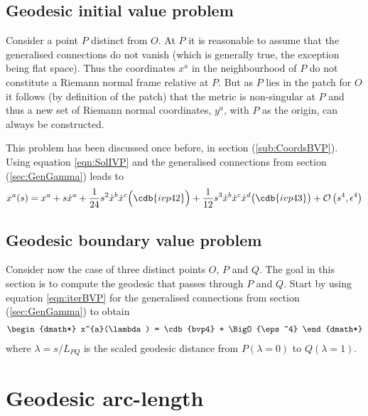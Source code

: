 \documentclass[a4paper,12pt]{article}
\numberwithin{equation}{section}
\begin{document}
\subsection{Geodesic initial value problem}\label{sec:GeodesicIVP}

Consider a point $P$ distinct from $O$. At $P$ it is reasonable to assume that the
generalised connections do not vanish (which is generally true, the exception being flat
space). Thus the coordinates $x^a$ in the neighbourhood of $P$ do not constitute a Riemann
normal frame relative at $P$. But as $P$ lies in the patch for $O$ it follows (by definition
of the patch) that the metric is non-singular at $P$ and thus a new set of Riemann normal
coordinates, $y^a$, with $P$ as the origin, can always be constructed.

This problem has been discussed once before, in section (\ref{sub:CoordsBVP}). Using equation
\eqref{eqn:SolIVP} and the generalised connections from section (\ref{sec:GenGamma}) leads to
%
\begin{dmath*}x^{a}(s)
   = x^{a}
   + s \dotx^{a}
   + \frac{1}{24} s^2 {\Dot x}^b {\Dot x}^c \Bigl(\cdb{ivp42}\Bigr)
   + \frac{1}{12} s^3 {\Dot x}^b {\Dot x}^c {\Dot x}^d \bigl(\cdb{ivp43}\bigr)
   + \BigO{s^4,\eps^4}\end{dmath*}
%
\subsection{Geodesic boundary value problem}\label{sec:GeodesicBVP}

Consider now the case of three distinct points $O$, $P$ and $Q$. The goal in this section is
to compute the geodesic that passes through $P$ and $Q$. Start by using equation
\eqref{eqn:iterBVP} for the generalised connections from section (\ref{sec:GenGamma}) to
obtain
%
\begin{dgroup*}[compact,spread={3pt}]
\begin{dmath*} x^{a}(\lambda) = \cdb{bvp4} + \BigO{\eps^4} \end{dmath*}
\end{dgroup*}
where $\lambda=s/L_{PQ}$ is the scaled geodesic distance from $P(\lambda=0)$ to
$Q(\lambda=1)$.

\section{Geodesic arc-length}\label{sec:ArcLength}
\end{document}
